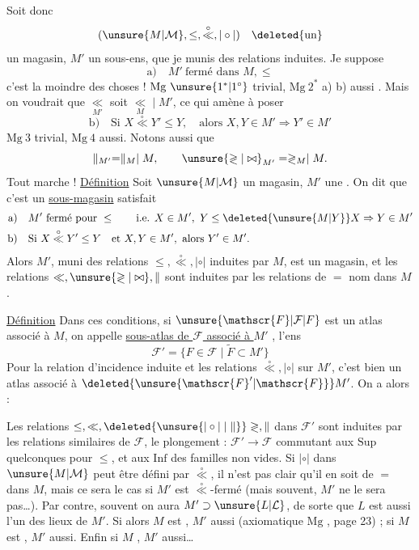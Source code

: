Soit donc
\[
(\unsure{M|\mathcal{M}},\leq,\overset{\circ}{\ll},\mathrel{|\circ|})\quad\deleted{\text{un}}
\]
un magasin, $M'$ un sous-ens, que je munis des relations induites.
Je suppose
\[
\text{a)}\quad M'\ \text{fermé dans }M,\leq
\]
c'est la moindre des choses ! $\mathrm{Mg}\ \unsure{1^*|1^\circ}$  trivial, $\mathrm{Mg}\ 2^*$ a) b) aussi . Mais on voudrait que $\underset{M'}{\ll}$  soit $\underset{M}{\ll}\mathrel{|}M'$, ce qui amène à poser
\[
\text{b)}\quad\text{Si }X\overset{\circ}{\ll}Y'\leq Y,\quad\text{alors }X,Y\in M'\Rightarrow Y'\in M'
\]
$\mathrm{Mg}\ 3$ trivial, $\mathrm{Mg}\ 4$ aussi. Notons aussi que
\[
\parallel_{M'}=\parallel_M\mathrel{|}M,\qquad\unsure{\gtrless|\bowtie}_{M'}=\gtrless_M\mathrel{|}M.
\]
Tout marche !
\uline{Définition} Soit $\unsure{M|\mathcal{M}}$ un magasin, $M'$ une . On dit que c'est un \uline{sous-magasin}  satisfait
\[
\begin{aligned}
\text{a)}\quad&M'\ \text{fermé pour }\leq\qquad\text{i.e. }X\in M',\ Y\leq\deleted{\unsure{M|Y}}X\Rightarrow Y\in M'\\
\text{b)}\quad&\text{Si }X\overset{\circ}{\ll}Y'\leq Y\quad\text{et }X,Y\in M',\ \text{alors }Y'\in M'.
\end{aligned}
\]
Alors $M'$, muni des relations $\leq,\overset{\circ}{\ll},\mathrel{|\circ|}$ induites par $M$, est un magasin, et les relations $\ll,\unsure{\gtrless|\bowtie},\parallel$  sont induites par les relations de $=$ nom dans $M$.

\uline{Définition} Dans ces conditions, si $\unsure{\mathscr{F}|\mathcal{F}|F}$ est un atlas associé à $M$, on appelle \uline{sous-atlas de $\mathscr{F}$ associé à $M'$} , l'ens  
\[
\mathscr{F}'=\{F\in\mathscr{F}\mid\widetilde{F}\subset M'\}
\]
Pour la relation d'incidence induite  et les relations $\overset{\circ}{\ll},\mathrel{|\circ|}$ sur $M'$, c'est bien un atlas associé à $\deleted{\unsure{\mathscr{F}'|\mathscr{F}}}M'$. On a alors :

Les relations $\leq,\ll,\deleted{\unsure{\mathrel{|\circ|}|\parallel}}\gtrless,\parallel$ dans $\mathscr{F}'$ sont induites par les relations similaires de $\mathscr{F}$, le plongement : $\mathscr{F}'\longrightarrow\mathscr{F}$ commutant aux $\mathrm{Sup}$ quelconques pour $\leq$, et aux $\mathrm{Inf}$ des familles non vides.
Si $\mathrel{|\circ|}$ dans $\unsure{M|\mathcal{M}}$ peut être défini par $\overset{\circ}{\ll}$, il n'est pas clair qu'il en soit de $=$ dans $M$, mais ce sera le cas si $M'$ est $\overset{\circ}{\ll}$-fermé (mais  souvent, $M'$ ne le sera pas\ldots). Par contre, souvent on aura $M'\supset\unsure{L|\mathcal{L}}$, de sorte que $L$ est aussi l'un des lieux de $M'$. Si alors $M$ est , $M'$ aussi (axiomatique $\mathrm{Mg}$ , page 23) ;  si $M$ est , $M'$ aussi. Enfin si $M$ , $M'$ aussi\ldots


